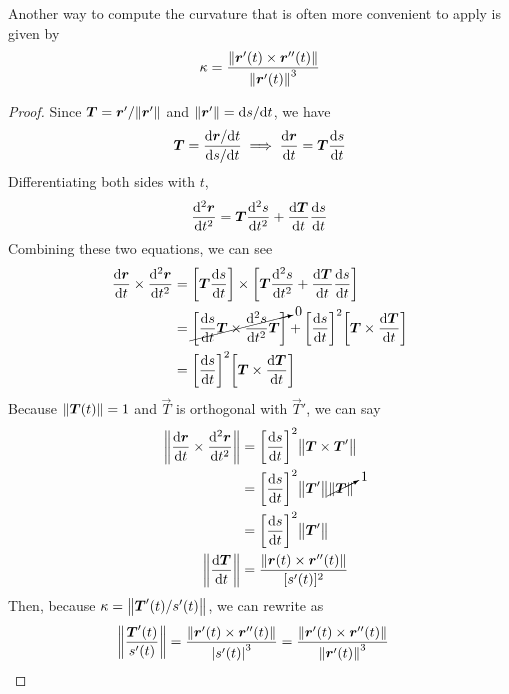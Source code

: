 Another way to compute the curvature that is often more convenient to apply is given by
\[ \kappa = \frac{\norm{\boldsymbol{r}'(t) \times \boldsymbol{r}''(t)}}{\norm{\boldsymbol{r}'(t)}^3}\]
\begin{proof}
    Since \(\boldsymbol{T} = \boldsymbol{r}'/\norm{\boldsymbol{r}'}\) and \(\norm{\boldsymbol{r}'} = \dd s/\dd t\), we have
    \[ \boldsymbol{T} = \frac{\dd \boldsymbol{r}/ \dd t}{\dd s/ \dd t} \implies \dv{\boldsymbol{r}}{t} = \boldsymbol{T} \dv{s}{t}\]
    Differentiating both sides with \(t\),
    \[ \dv[2]{\boldsymbol{r}}{t} = \boldsymbol{T}\dv[2]{s}{t} + \dv{\boldsymbol{T}}{t}\dv{s}{t} \]
    Combining these two equations, we can see
    \begin{align*}
        \dv{\vec r}{t}\times \dv[2]{\vec r}{t} &= \bqty{\vec T\dv{s}{t}}\times \bqty{\vec T\dv[2]{s}{t}+\dv{\vec T}{t}\dv{s}{t}} \\
        &= \cancelto{0}{\bqty{\dv{s}{t}\vec T\times \dv[2]{s}{t}\vec T}} + \bqty{\dv{s}{t}}^2\bqty{\vec T \times \dv{\vec T}{t}} \\
        &= \bqty{\dv{s}{t}}^2\bqty{\vec T\times \dv{\vec T}{t}}
    \end{align*}
    Because \(\norm{\boldsymbol{T}(t)}=1\) and \(\vec T\) is orthogonal with \(\vec T'\), we can say
    \begin{align*}
        \norm{\dv{\vec r}{t}\times \dv[2]{\vec r}{t}} &= \bqty{\dv{s}{t}}^2\norm{\vec T \times \vec T'} \\
        &= \bqty{\dv{s}{t}}^2\norm{\vec T'}\cancelto{1}{\norm{\vec T}} \\
        &= \bqty{\dv{s}{t}}^2\norm{\vec T'}   \\      \norm{\dv{\vec T}{t}} &= \frac{\norm{\vec r(t) \times \vec r''(t)}}{[s'(t)]^2}
    \end{align*}
    Then, because \(\kappa = \norm{\boldsymbol{T}'(t)/s'(t)}\), we can rewrite as
    \begin{align*}
        \norm{\frac{\boldsymbol{T}'(t)}{s'(t)}} &= \frac{\norm{\boldsymbol{r}'(t)\times \boldsymbol{r}''(t)}}{\abs{s'(t)}^3} = \frac{\norm{\boldsymbol{r}'(t)\times \boldsymbol{r}''(t)}}{\norm{\boldsymbol{r}'(t)}^3}
    \end{align*}
\end{proof}
